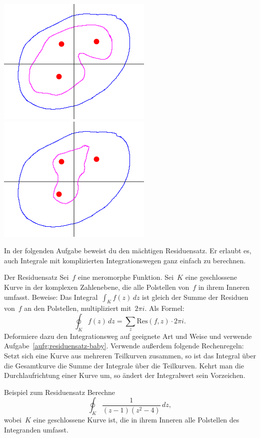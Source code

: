 \documentclass[twoside]{../zirkelblatt1415}
\theoremstyle{definition}
\theoremstyle{plain}
\theoremstyle{remark}
\newcommand{\Res}{\mathrm{Res}}
\begin{document}
\begin{center}
\includegraphics[scale=0.75]{path-independence-1}\qquad\qquad
\includegraphics[scale=0.75]{path-independence-2}
\end{center}

In der folgenden Aufgabe beweist du den mächtigen Residuensatz. Er erlaubt es,
auch Integrale mit komplizierten Integrationswegen ganz einfach zu berechnen.
\begin{aufgabe}{Der Residuensatz}
Sei~$f$ eine meromorphe Funktion. Sei~$K$ eine geschlossene Kurve in der
komplexen Zahlenebene, die alle Polstellen von~$f$ in ihrem Inneren umfasst.
Beweise: Das Integral~$\int_K f(z) \,dz$ ist gleich der Summe der Residuen
von~$f$ an den Polstellen, multipliziert mit~$2 \pi i$. Als Formel:
\[ \oint_K f(z) \,dz = \sum_z \Res(f,z) \cdot 2 \pi i. \]
Deformiere dazu den Integrationsweg auf geeignete Art und Weise und verwende
Aufgabe~\ref{aufg:residuensatz-baby}. Verwende außerdem folgende Rechenregeln:
Setzt sich eine Kurve aus mehreren Teilkurven zusammen, so ist das Integral
über die Gesamtkurve die Summe der Integrale über die Teilkurven. Kehrt man die
Durchlaufrichtung einer Kurve um, so ändert der Integralwert sein Vorzeichen.
\end{aufgabe}

\begin{aufgabe}{Beispiel zum Residuensatz}
Berechne
\[ \oint_K \frac{1}{(z-1) (z^2-4)} \,dz, \]
wobei~$K$ eine geschlossene Kurve ist, die in ihrem Inneren alle Polstellen des
Integranden umfasst.
\end{aufgabe}
\end{document}
